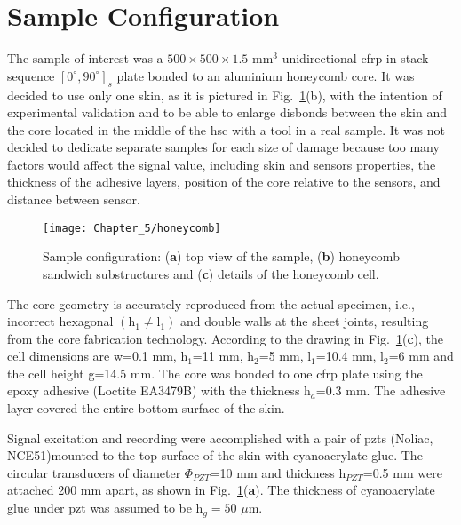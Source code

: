 \section{Sample Configuration}
\label{sec:sample}

The sample of interest was a \(500\times500\times1.5\) mm\(^3\) unidirectional \ac{cfrp} in stack sequence \([0^{\circ},90^{\circ}]_s\) plate bonded to an aluminium honeycomb core. 
It was decided to use only one skin, as it is pictured in Fig.~\ref{fig:honeycomb}(b), with the intention of experimental validation and to be able to enlarge disbonds between the skin and the core located in the middle of the \ac{hsc} with a tool in a real sample. 
It was not decided to dedicate separate samples for each size of damage because too many factors would affect the signal value, including skin and sensors properties, the thickness of the adhesive layers, position of the core relative to the sensors, and distance between sensor.
\begin{figure}[H]
	\begin{center}
		\texttt{[image: Chapter\_5/honeycomb]}
	\end{center}
	\caption{Sample configuration: (\textbf{a}) top view of the sample, (\textbf{b}) honeycomb sandwich substructures and (\textbf{c}) details of the honeycomb cell.}
	\label{fig:honeycomb}
\end{figure}

The core geometry is accurately reproduced from the actual specimen, i.e., incorrect hexagonal \(\left(\mathrm{h}_1 \ne \mathrm{l}_1\right)\) and double walls at the sheet joints, resulting from the core fabrication technology.
According to the drawing in Fig.~\ref{fig:honeycomb}(\textbf{c}), the cell dimensions are w=0.1 mm, h\(_1\)=11 mm, h\(_2\)=5 mm, l\(_1\)=10.4 mm, l\(_2\)=6 mm and the cell height g=14.5 mm.
The core was bonded to one \ac{cfrp} plate using the epoxy adhesive (Loctite EA3479B) with the thickness h\(_a\)=0.3 mm.
The adhesive layer covered the entire bottom surface of the skin.

Signal excitation and recording were accomplished with a pair of \acp{pzt}  (Noliac, NCE51)mounted to the top surface of the skin with cyanoacrylate glue.
The circular transducers of diameter \(\Phi_{PZT}\)=10 mm and thickness h\(_{PZT}\)=0.5 mm were attached 200 mm apart, as shown in Fig.~\ref{fig:honeycomb}(\textbf{a}). The thickness of cyanoacrylate glue under \ac{pzt} was assumed to be h\(_g=50\) \(\mu\)m.


